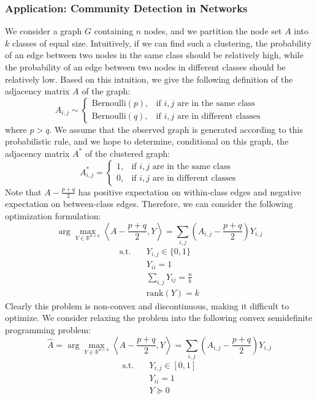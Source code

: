 \subsubsection{Application: Community Detection in Networks}
We consider a graph $G$ containing $n$ nodes, and we partition the node set $A$ into $k$ classes of equal size. Intuitively, if we can find such a clustering, the probability of an edge between two nodes in the same class should be relatively high, while the probability of an edge between two nodes in different classes should be relatively low. Based on this intuition, we give the following definition of the adjacency matrix $A$ of the graph:
\begin{equation*}
A_{i,j} \sim 
\begin{cases}
\text{Bernoulli}(p), & \text{if } i,j \text{ are in the same class} \\
\text{Bernoulli}(q), & \text{if } i,j \text{ are in different classes}
\end{cases}
\end{equation*}
where $p > q$. We assume that the observed graph is generated according to this probabilistic rule, and we hope to determine, conditional on this graph, the adjacency matrix $A^*$ of the clustered graph:
\begin{equation*}
A^*_{i,j} = 
\begin{cases}
1, & \text{if } i,j \text{ are in the same class} \\
0, & \text{if } i,j \text{ are in different classes}
\end{cases}
\end{equation*}
Note that $A - \frac{p+q}{2}$ has positive expectation on within-class edges and negative expectation on between-class edges. Therefore, we can consider the following optimization formulation:
\begin{equation*}
\arg\max_{Y \in \mathbb{R}^{n \times n}} \left\langle A - \frac{p+q}{2}, Y \right\rangle = \sum_{i,j} \left( A_{i,j} - \frac{p+q}{2} \right) Y_{i,j}
\end{equation*}
\begin{align*}
\text{s.t.} \quad & Y_{i,j} \in \{0,1\} \\
& Y_{ii} = 1 \\
& \sum_{i,j} Y_{ij} = \frac{n}{k} \\
& \text{rank}(Y) = k
\end{align*}
Clearly this problem is non-convex and discontinuous, making it difficult to optimize. We consider relaxing the problem into the following convex semidefinite programming problem:
\begin{equation*}
\hat{A} = \arg\max_{Y \in \mathbb{R}^{n \times n}} \left\langle A - \frac{p+q}{2}, Y \right\rangle = \sum_{i,j} \left( A_{i,j} - \frac{p+q}{2} \right) Y_{i,j}
\end{equation*}
\begin{align*}
\text{s.t.} \quad & Y_{i,j} \in [0,1] \\
& Y_{ii} = 1 \\
& Y \succeq 0
\end{align*}

